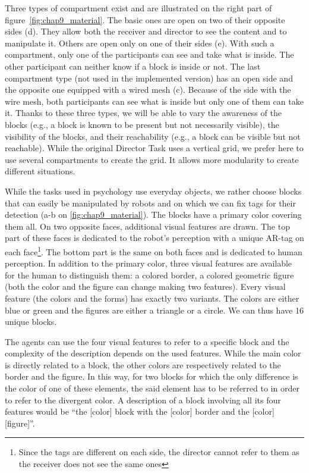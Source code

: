 Three types of compartment exist and are illustrated on the right part of figure~\ref{fig:chap9_material}. The basic ones are open on two of their opposite sides (d). They allow both the receiver and director to see the content and to manipulate it. Others are open only on one of their sides (e). With such a compartment, only one of the participants can see and take what is inside. The other participant can neither know if a block is inside or not. The last compartment type (not used in the implemented version) has an open side and the opposite one equipped with a wired mesh (c). Because of the side with the wire mesh, both participants can see what is inside but only one of them can take it. Thanks to these three types, we will be able to vary the awareness of the blocks (e.g., a block is known to be present but not necessarily visible), the visibility of the blocks, and their reachability (e.g., a block can be visible but not reachable). While the original Director Task uses a vertical grid, we prefer here to use several compartments to create the grid. It allows more modularity to create different situations.

While the tasks used in psychology use everyday objects, we rather choose blocks that can easily be manipulated by robots and on which we can fix tags for their detection (a-b on \ref{fig:chap9_material}). The blocks have a primary color covering them all. On two opposite faces, additional visual features are drawn. The top part of these faces is dedicated to the robot's perception with a unique AR-tag on each face\footnote{Since the tags are different on each side, the director cannot refer to them as the receiver does not see the same ones}. The bottom part is the same on both faces and is dedicated to human perception. In addition to the primary color, three visual features are available for the human to distinguish them: a colored border, a colored geometric figure (both the color and the figure can change making two features). Every visual feature (the colors and the forms) has exactly two variants. The colors are either blue or green and the figures are either a triangle or a circle. We can thus have 16 unique blocks.

The agents can use the four visual features to refer to a specific block and the complexity of the description depends on the used features. While the main color is directly related to a block, the other colors are respectively related to the border and the figure. In this way, for two blocks for which the only difference is the color of one of these elements, the said element has to be referred to in order to refer to the divergent color. A description of a block involving all its four features would be ``the [color] block with the [color] border and the [color] [figure]''.

